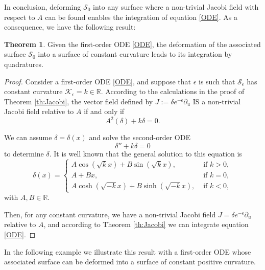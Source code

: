 \documentclass{article}
\theoremstyle{remark}
\theoremstyle{definition}
\newtheorem{theorem}[remark]{Theorem}
\begin{document}
In conclusion, deforming $\mathcal{S}_0$ into any surface where a non-trivial Jacobi field with respect to $A$ can be found enables the integration of equation \eqref{ODE}. As a consequence, we have the following result:

\begin{theorem}\label{th:curv}
Given the first-order ODE \eqref{ODE}, the deformation of the associated surface $\mathcal{S}_0$ into a surface of constant curvature leads to its integration by quadratures.
\end{theorem}

\begin{proof}
Consider a first-order ODE \eqref{ODE}, and suppose that $\epsilon$ is such that $\mathcal{S}_{\epsilon}$ has constant curvature $\mathcal{K}_{\epsilon}=k\in\mathbb{R}$. According to the calculations in the proof of Theorem \ref{th:Jacobi}, the vector field defined by $J:=\delta e^{-\epsilon}\partial_u$ IS a non-trivial Jacobi field relative to $A$ if and only if
$$
A^2(\delta)+k \delta=0.
$$

We can assume $\delta=\delta(x)$ and solve the second-order ODE
\begin{equation}\label{eqDeltaKcte}
    \delta''+k \delta=0
\end{equation}
to determine $\delta$. It is well known that the general solution to this equation is
\begin{equation}\label{eq:deltaKcte}
    \delta(x)=\begin{cases}
        A \cos\left(\sqrt{k}x\right)+B \sin\left(\sqrt{k}x\right), & \text{ if } k>0,\\
        A+B x, & \text{ if } k=0,\\
        A \cosh\left(\sqrt{-k}x\right)+B \sinh\left(\sqrt{-k}x\right), & \text{ if } k<0,
        \end{cases}
\end{equation}
with $A,B\in\mathbb{R}$.

Then, for any constant curvature, we have a non-trivial Jacobi field $J=\delta e^{-\epsilon}\partial_u$ relative to $A$, and according to Theorem \ref{th:Jacobi} we can integrate equation \eqref{ODE}.
\end{proof}

In the following example we illustrate this result with a first-order ODE whose associated surface can be deformed into a surface of constant positive curvature.
\end{document}
